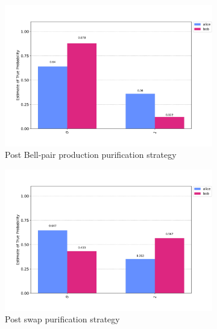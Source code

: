\documentclass[11pt]{article}
\begin{document}
\begin{figure}[ht]
  \centering
  \begin{subfigure}[b]{0.45\textwidth}
    \includegraphics[width=\linewidth]{figures/dps_verification_post_bell_pair.jpg}
    \caption{Post Bell-pair production purification strategy}
    \label{fig:deutsch_purification_strategy_verification_results_post_bell_pair}
  \end{subfigure}
  \begin{subfigure}[b]{0.45\textwidth}
    \includegraphics[width=\linewidth]{figures/dps_verification_post_swap.jpg}
    \caption{Post swap purification strategy}
    \label{fig:deutsch_purification_strategy_verification_results_post_swap}
  \end{subfigure}
  \\
  \begin{subfigure}[b]{0.45\textwidth}

\end{subfigure}
\end{figure}
\end{document}
